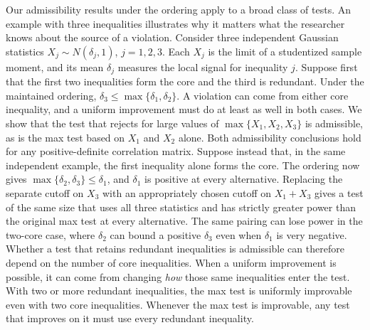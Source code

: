 \documentclass[11pt]{article}
\newcommand{\red}[1]{{\color{red}#1}} %
\numberwithin{equation}{section}
\theoremstyle{definition}
\begin{document}
Our admissibility results under the ordering apply to a broad class of tests. An example with three inequalities illustrates why it matters what the researcher knows about the source of a violation. Consider three independent Gaussian statistics $X_j\sim N(\delta_j,1)$, $j=1,2,3$. Each $X_j$ is the limit of a studentized sample moment, and its mean $\delta_j$ measures the local signal for inequality $j$. Suppose first that the first two inequalities form the core and the third is redundant. Under the maintained ordering, $\delta_3\le\max\{\delta_1,\delta_2\}$. A violation can come from either core inequality, and a uniform improvement must do at least as well in both cases. We show that the test that rejects for large values of $\max\{X_1,X_2,X_3\}$ is admissible, as is the max test based on $X_1$ and $X_2$ alone. Both admissibility conclusions hold for any positive-definite correlation matrix. Suppose instead that, in the same independent example, the first inequality alone forms the core. The ordering now gives $\max\{\delta_2,\delta_3\}\le\delta_1$, and $\delta_1$ is positive at every alternative. Replacing the separate cutoff on $X_3$ with an appropriately chosen cutoff on $X_1+X_3$ gives a test of the same size that uses all three statistics and has strictly greater power than the original max test at every alternative. The same pairing can lose power in the two-core case, where $\delta_2$ can bound a positive $\delta_3$ even when $\delta_1$ is very negative. Whether a test that retains redundant inequalities is admissible can therefore depend on the number of core inequalities. When a uniform improvement is possible, it can come from changing \emph{how} those same inequalities enter the test. \red{With two or more redundant inequalities, the max test is uniformly improvable even with two core inequalities. Whenever the max test is improvable, any test that improves on it must use every redundant inequality.}
\end{document}
